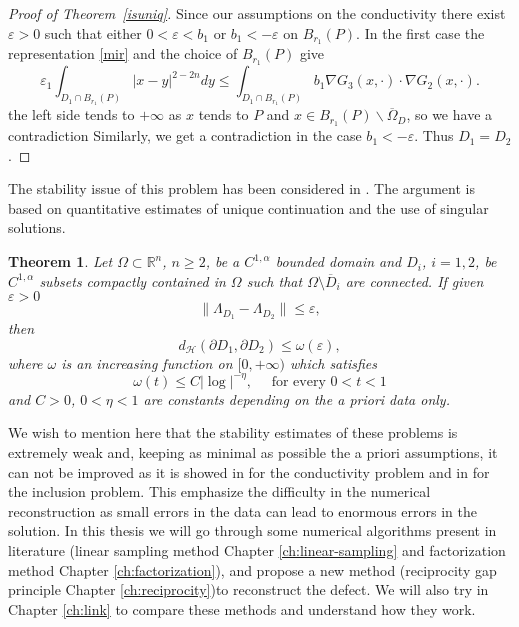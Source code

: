 \documentclass[10pt, a4paper, twoside, openright]{book}
\theoremstyle{definition}
\theoremstyle{plain}
\newtheorem{theorem}[subsection]{Theorem}
\theoremstyle{plain}
\theoremstyle{plain}
\theoremstyle{plain}
\theoremstyle{plain}
\theoremstyle{plain}
\theoremstyle{plain}
\theoremstyle{plain}
\begin{document}
\begin{proof}[Proof of Theorem~\ref{isuniq}]
Since our assumptions on the conductivity there exist $\varepsilon>0$ such that
either $0<\varepsilon<b_1$ or $b_1<-\varepsilon$ on $B_{r_1}(P)$.
In the first case the representation \eqref{mir} and the choice of
$B_{r_1}(P)$ give
$$\varepsilon_1\int_{D_1\cap B_{r_1}(P)}|x-y|^{2-2n}dy
\leq\int_{D_1\cap B_{r_1}(P)}b_1\nabla G_3(x,\cdot)\cdot\nabla G_2(x,\cdot).$$
the left side tends to $+\infty$ as $x$ tends to $P$
and $x\in B_{r_1}(P)\smallsetminus\overline\Omega_D$, so we have a contradiction
Similarly, we get a contradiction in the case $b_1<-\varepsilon$.
Thus $D_1=D_2$.
\end{proof}
The stability issue of this problem has been considered in \cite{Al-DC}.
The argument is based on quantitative estimates of unique continuation and the use of singular solutions.
\begin{theorem}
Let $\Omega\subset\mathbb R^n$, $n\geq2$, be a $C^{1,\alpha}$ bounded domain and
$D_i$, $i=1,2$, be $C^{1,\alpha}$ subsets compactly contained in $\Omega$ such that
$\Omega\setminus\overline D_i$ are connected. If given $\varepsilon>0$
$$\|\Lambda_{D_1}-\Lambda_{D_2}\|\leq\varepsilon,$$
then
$$d_\mathcal H(\partial D_1,\partial D_2)\leq\omega(\varepsilon),$$
where $\omega$ is an increasing function on $[0,+\infty)$ which satisfies
$$\omega(t)\leq C|\log|^{-\eta},\quad\textrm{ for every } 0<t<1$$
and $C>0$, $0<\eta<1$ are constants depending on the a priori data only.
\end{theorem}
We wish to mention here that the stability estimates of these problems is extremely weak
and, keeping as minimal as possible the a priori assumptions, it can not be improved as it
is showed in \cite{Ma} for the conductivity problem and in \cite{DC-Ro} for the inclusion problem.
This emphasize the difficulty in the numerical reconstruction as small errors in the data
can lead to enormous errors in the solution.
In this thesis we will go through some numerical algorithms present in literature
(linear sampling method Chapter \ref{ch:linear-sampling} and factorization method Chapter \ref{ch:factorization}), 
and propose a new method (reciprocity gap principle Chapter \ref{ch:reciprocity})to reconstruct the defect.
We will also try in Chapter \ref{ch:link} to compare these methods and understand how they work.
\end{document}
